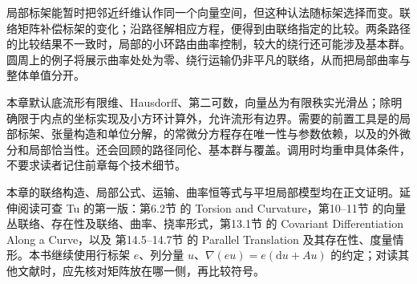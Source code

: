 \ProseParagraphBreak

局部标架能暂时把邻近纤维认作同一个向量空间，但这种认法随标架选择而变。联络矩阵补偿标架的变化；沿路径解相应方程，便得到由联络指定的比较。两条路径的比较结果不一致时，局部的小环路由曲率控制，较大的绕行还可能涉及基本群。圆周上的例子将展示曲率处处为零、绕行运输仍非平凡的联络，从而把局部曲率与整体单值分开。

\ProseParagraphBreak

本章默认底流形有限维、Hausdorff、第二可数，向量丛为有限秩实光滑丛；除明确限于内点的坐标实现及小方环计算外，允许流形有边界。需要的前置工具是的局部标架、张量构造和单位分解，的常微分方程存在唯一性与参数依赖，以及的外微分和局部恰当性。还会回顾的路径同伦、基本群与覆盖。调用时均重申具体条件，不要求读者记住前章每个技术细节。

\ProseParagraphBreak

本章的联络构造、局部公式、运输、曲率恒等式与平坦局部模型均在正文证明。延伸阅读可查 Tu 的第一版：第6.2节 的 Torsion and Curvature，第10--11节 的向量丛联络、存在性及联络、曲率、挠率形式，第13.1节 的 Covariant Differentiation Along a Curve，以及 第14.5--14.7节 的 Parallel Translation 及其存在性、度量情形\cite[第6.2、10--11、13.1、14.5--14.7节]{Tu2017Connections}。本书继续使用行标架 \(e\)、列分量 \(u\)、\(\nabla(eu)=e(\mathrm{d}u+Au)\) 的约定；对读其他文献时，应先核对矩阵放在哪一侧，再比较符号。







